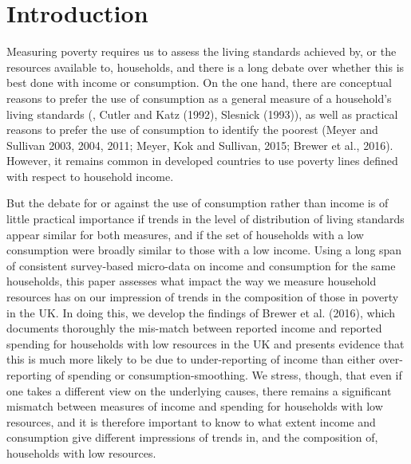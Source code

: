 
\section{Introduction} 



Measuring poverty requires us to assess the living standards achieved by, or the resources available to, households, and there is a long debate over whether this is best done with income or consumption. On the one hand, there are conceptual reasons to prefer the use of consumption as a general measure of a household's living standards (\cite{Poterba1989}, Cutler and Katz (1992), Slesnick (1993)), as well as practical reasons to prefer the use of consumption to identify the poorest (Meyer and Sullivan 2003, 2004, 2011; Meyer, Kok and Sullivan, 2015; Brewer et al., 2016). However, it remains common in developed countries to use poverty lines defined with respect to household income. 

But the debate for or against the use of consumption rather than income is of little practical importance if trends in the level of distribution of living standards appear similar for both measures, and if the set of households with a low consumption were broadly similar to those with a low income. Using a long span of consistent survey-based micro-data on income and consumption for the same households, this paper assesses what impact the way we measure household resources has on our impression of trends in the composition of those in poverty in the UK. In doing this, we develop the findings of Brewer et al. (2016), which documents thoroughly the mis-match between reported income and reported spending for households with low resources in the UK and presents evidence that this is much more likely to be due to under-reporting of income than either over-reporting of spending or consumption-smoothing. We stress, though, that even if one takes a different view on the underlying causes, there remains a significant mismatch between measures of income and spending for households with low resources, and it is therefore important to know to what extent income and consumption give different impressions of trends in, and the composition of, households with low resources. 

